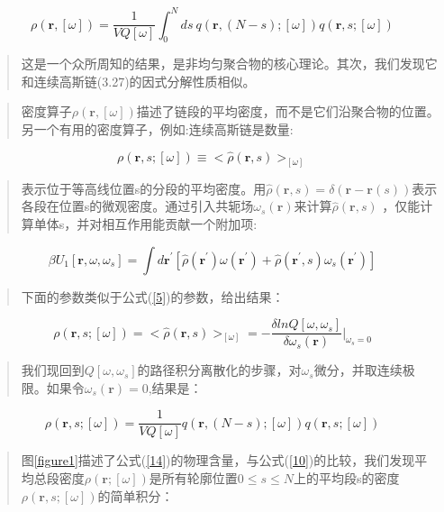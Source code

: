 \begin{equation}\label{10}
\rho(\mathbf{r},[\omega])=\frac{1}{VQ[\omega]}\int_{0}^{N}ds~q(\mathbf{r},(N-s);[\omega])q(\mathbf{r},s;[\omega])
\end{equation}
\begin{quotation}
这是一个众所周知的结果，是非均匀聚合物的核心理论。其次，我们发现它和连续高斯链(3.27)的因式分解性质相似。
\end{quotation}
\begin{quotation}
密度算子$\rho(\mathbf{r},[\omega])$描述了链段的平均密度，而不是它们沿聚合物的位置。另一个有用的密度算子，例如:连续高斯链是数量:
\end{quotation}
\begin{equation}\label{11}
\rho(\mathbf{r},s;[\omega])\equiv <\hat{\rho}(\mathbf{r},s)>_{[\omega]}
\end{equation}
\begin{quotation}
表示位于等高线位置s的分段的平均密度。用$\hat{\rho}(\mathbf{r},s)=\delta(\mathbf{r}-\mathbf{r}(s))$表示各段在位置s的微观密度。通过引入共轭场$\omega_s(\mathbf{r})$来计算$\hat{\rho}(\mathbf{r},s)$
，仅能计算单体s，并对相互作用能贡献一个附加项:
\end{quotation}
\begin{equation}\label{12}
\beta U_1[\mathbf{r},\omega ,\omega_s]=\int d\mathbf{r}^{'}[\hat{\rho}(\mathbf{r}^{'})\omega (\mathbf{r}^{'})+\hat{\rho}(\mathbf{r}^{'},s)\omega_s(\mathbf{r}^{'})]
\end{equation}
\begin{quotation}
下面的参数类似于公式(\ref{5})的参数，给出结果：
\end{quotation}
\begin{equation}\label{13}
\rho(\mathbf{r},s;[\omega])=<\hat{\rho}(\mathbf{r},s)>_{[\omega]}
=-\frac{\delta lnQ[\omega,\omega_s]}{\delta \omega_s(\mathbf{r})} \bigg |_{\omega_s=0}
\end{equation}
\begin{quotation}
我们现回到$Q[\omega,\omega_s]$的路径积分离散化的步骤，对$\omega_s$微分，并取连续极限。如果令$\omega_s(\mathbf{r})=0$,结果是：
\end{quotation}
\begin{equation}\label{14}
\rho(\mathbf{r},s;[\omega])=\frac{1}{VQ[\omega]}q(\mathbf{r},(N-s);[\omega])q(\mathbf{r},s;[\omega])
\end{equation}
\begin{quotation}
图\ref{figure1}描述了公式(\ref{14})的物理含量，与公式(\ref{10})的比较，我们发现平均总段密度$\rho(\mathbf{r};[\omega])$是所有轮廓位置$0\le s\le N$上的平均段s的密度$\rho(\mathbf{r},s;[\omega])$的简单积分：
\end{quotation}

